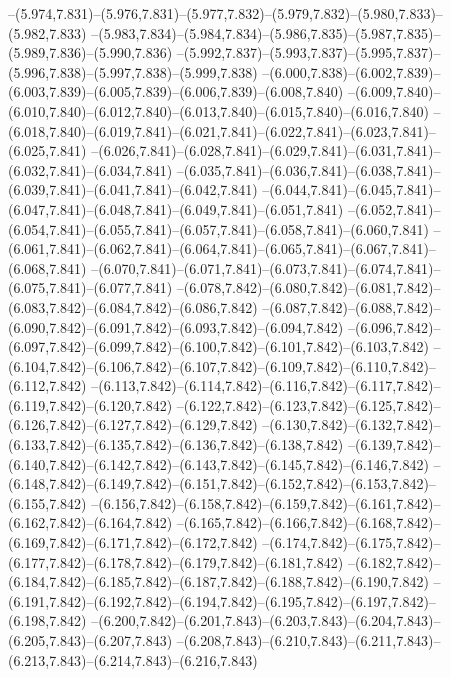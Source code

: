   --(5.974,7.831)--(5.976,7.831)--(5.977,7.832)--(5.979,7.832)--(5.980,7.833)--(5.982,7.833)%
  --(5.983,7.834)--(5.984,7.834)--(5.986,7.835)--(5.987,7.835)--(5.989,7.836)--(5.990,7.836)%
  --(5.992,7.837)--(5.993,7.837)--(5.995,7.837)--(5.996,7.838)--(5.997,7.838)--(5.999,7.838)%
  --(6.000,7.838)--(6.002,7.839)--(6.003,7.839)--(6.005,7.839)--(6.006,7.839)--(6.008,7.840)%
  --(6.009,7.840)--(6.010,7.840)--(6.012,7.840)--(6.013,7.840)--(6.015,7.840)--(6.016,7.840)%
  --(6.018,7.840)--(6.019,7.841)--(6.021,7.841)--(6.022,7.841)--(6.023,7.841)--(6.025,7.841)%
  --(6.026,7.841)--(6.028,7.841)--(6.029,7.841)--(6.031,7.841)--(6.032,7.841)--(6.034,7.841)%
  --(6.035,7.841)--(6.036,7.841)--(6.038,7.841)--(6.039,7.841)--(6.041,7.841)--(6.042,7.841)%
  --(6.044,7.841)--(6.045,7.841)--(6.047,7.841)--(6.048,7.841)--(6.049,7.841)--(6.051,7.841)%
  --(6.052,7.841)--(6.054,7.841)--(6.055,7.841)--(6.057,7.841)--(6.058,7.841)--(6.060,7.841)%
  --(6.061,7.841)--(6.062,7.841)--(6.064,7.841)--(6.065,7.841)--(6.067,7.841)--(6.068,7.841)%
  --(6.070,7.841)--(6.071,7.841)--(6.073,7.841)--(6.074,7.841)--(6.075,7.841)--(6.077,7.841)%
  --(6.078,7.842)--(6.080,7.842)--(6.081,7.842)--(6.083,7.842)--(6.084,7.842)--(6.086,7.842)%
  --(6.087,7.842)--(6.088,7.842)--(6.090,7.842)--(6.091,7.842)--(6.093,7.842)--(6.094,7.842)%
  --(6.096,7.842)--(6.097,7.842)--(6.099,7.842)--(6.100,7.842)--(6.101,7.842)--(6.103,7.842)%
  --(6.104,7.842)--(6.106,7.842)--(6.107,7.842)--(6.109,7.842)--(6.110,7.842)--(6.112,7.842)%
  --(6.113,7.842)--(6.114,7.842)--(6.116,7.842)--(6.117,7.842)--(6.119,7.842)--(6.120,7.842)%
  --(6.122,7.842)--(6.123,7.842)--(6.125,7.842)--(6.126,7.842)--(6.127,7.842)--(6.129,7.842)%
  --(6.130,7.842)--(6.132,7.842)--(6.133,7.842)--(6.135,7.842)--(6.136,7.842)--(6.138,7.842)%
  --(6.139,7.842)--(6.140,7.842)--(6.142,7.842)--(6.143,7.842)--(6.145,7.842)--(6.146,7.842)%
  --(6.148,7.842)--(6.149,7.842)--(6.151,7.842)--(6.152,7.842)--(6.153,7.842)--(6.155,7.842)%
  --(6.156,7.842)--(6.158,7.842)--(6.159,7.842)--(6.161,7.842)--(6.162,7.842)--(6.164,7.842)%
  --(6.165,7.842)--(6.166,7.842)--(6.168,7.842)--(6.169,7.842)--(6.171,7.842)--(6.172,7.842)%
  --(6.174,7.842)--(6.175,7.842)--(6.177,7.842)--(6.178,7.842)--(6.179,7.842)--(6.181,7.842)%
  --(6.182,7.842)--(6.184,7.842)--(6.185,7.842)--(6.187,7.842)--(6.188,7.842)--(6.190,7.842)%
  --(6.191,7.842)--(6.192,7.842)--(6.194,7.842)--(6.195,7.842)--(6.197,7.842)--(6.198,7.842)%
  --(6.200,7.842)--(6.201,7.843)--(6.203,7.843)--(6.204,7.843)--(6.205,7.843)--(6.207,7.843)%
  --(6.208,7.843)--(6.210,7.843)--(6.211,7.843)--(6.213,7.843)--(6.214,7.843)--(6.216,7.843)%
